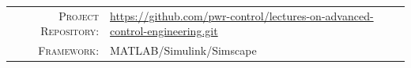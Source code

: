 \documentclass[11pt,a4paper,oneside]{book}
\newcommand{\MetaLabelA}{Project Repository}
\newcommand{\MetaValueA}{https://github.com/pwr-control/lectures-on-advanced-control-engineering.git}
\newcommand{\MetaLabelB}{Framework}
\newcommand{\MetaValueB}{MATLAB/Simulink/Simscape}
\newcommand{\MetaLabelC}{Architecture}
\newcommand{\MetaValueC}{SiC, EiceDRIVER, Customized Power Supplies}
\begin{document}
	\vfill
	
	\noindent
	\begin{tabular}{@{} r @{\quad} l @{}}
		\textsc{\small\MetaLabelA:} & {\small\url{\MetaValueA}} \\[3pt]
		\textsc{\small\MetaLabelB:} & {\small\MetaValueB}       \\[3pt]
	\end{tabular}
	
	\newpage
	\setcounter{page}{1}
	\tableofcontents
	\listoffigures	
	\listoftables
	\newpage
	
\end{document}
